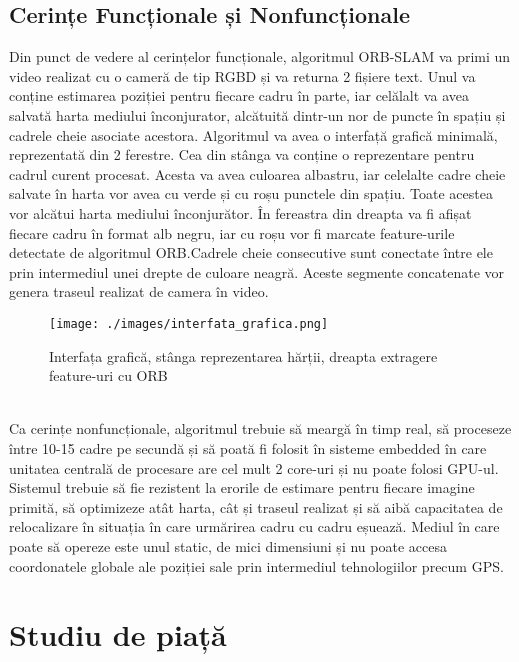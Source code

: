 \documentclass[12pt,a4paper]{report}
\begin{document}
\section{Cerințe Funcționale și Nonfuncționale}
Din punct de vedere al cerințelor funcționale, algoritmul ORB-SLAM va primi 
un video realizat cu o cameră de tip RGBD și va returna 2 fișiere text. Unul va conține
estimarea poziției pentru fiecare cadru în parte, iar celălalt va avea salvată harta 
mediului înconjurator, alcătuită dintr-un nor de puncte în spațiu și cadrele cheie
asociate acestora. Algoritmul va avea o interfață grafică minimală, reprezentată din 2 
ferestre. Cea din stânga va conține o reprezentare pentru cadrul curent procesat. 
Acesta va avea culoarea albastru, iar celelalte cadre cheie salvate în harta vor avea cu 
verde și cu roșu punctele din spațiu. Toate acestea vor alcătui harta mediului
înconjurător. În fereastra din dreapta va fi afișat fiecare cadru în format alb negru,
iar cu roșu vor fi marcate feature-urile detectate de algoritmul ORB.\@ Cadrele cheie 
consecutive sunt conectate între ele prin intermediul unei drepte de culoare neagră.
Aceste segmente concatenate vor genera traseul realizat de camera în video. 
\begin{figure}[htbp] 
  \centering
  \texttt{[image: ./images/interfata\_grafica.png]}
  \caption{Interfața grafică, stânga reprezentarea hărții, dreapta extragere feature-uri cu ORB}\label{fig:exemplu_imagine}
\end{figure}  \\         
Ca cerințe nonfuncționale, algoritmul trebuie să meargă în timp real, să 
proceseze între 10{-}15 cadre pe secundă și să poată fi folosit în sisteme embedded
în care unitatea centrală de procesare are cel mult 2 core-uri și nu poate folosi GPU-ul.
Sistemul trebuie să fie
rezistent la erorile de estimare pentru fiecare imagine primită, să optimizeze atât
harta, cât și traseul realizat și să aibă capacitatea de relocalizare în situația în care
urmărirea cadru cu cadru eșuează. Mediul în care poate să opereze este unul static, de
mici dimensiuni și nu poate accesa coordonatele globale ale poziției sale prin intermediul
tehnologiilor precum GPS.\@

\chapter{Studiu de piață}
\end{document}
